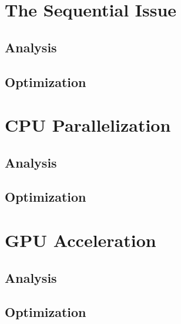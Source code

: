 \documentclass{egpubl}
\begin{document}
\section{The Sequential Issue}

\subsection{Analysis}

\subsection{Optimization}


\section{CPU Parallelization}

\subsection{Analysis}

\subsection{Optimization}

\section{GPU Acceleration}

\subsection{Analysis}

\subsection{Optimization}
\end{document}
